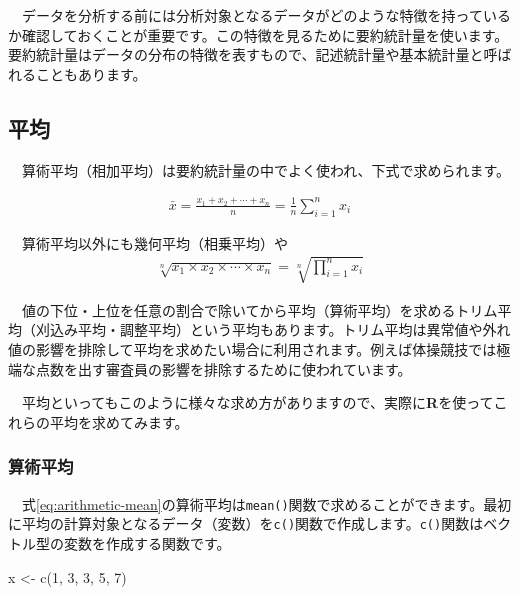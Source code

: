 \documentclass[
  12pt,
]{book}
\newenvironment{Shaded}{\begin{snugshade}}{\end{snugshade}}
\newcommand{\DecValTok}[1]{\textcolor[rgb]{0.00,0.00,0.81}{#1}}
\newcommand{\FunctionTok}[1]{\textcolor[rgb]{0.00,0.00,0.00}{#1}}
\newcommand{\NormalTok}[1]{#1}
\newcommand{\OtherTok}[1]{\textcolor[rgb]{0.56,0.35,0.01}{#1}}
\begin{document}
　データを分析する前には分析対象となるデータがどのような特徴を持っているか確認しておくことが重要です。この特徴を見るために要約統計量を使います。要約統計量はデータの分布の特徴を表すもので、記述統計量や基本統計量と呼ばれることもあります。

\hypertarget{ux5e73ux5747}{%
\subsection{平均}\label{ux5e73ux5747}}

　算術平均（相加平均）は要約統計量の中でよく使われ、下式で求められます。

\begin{align}
  \bar{x} = \frac{x_1 + x_2 + \cdots + x_n}{n} = \frac{1}{n} \sum_{i = 1}^n x_i \label{eq:arithmetic-mean}
\end{align}

　算術平均以外にも幾何平均（相乗平均）や \begin{align}
  \sqrt[n]{x_1 \times x_2 \times \cdots \times x_n} = \sqrt[n]{\prod_{i = 1}^n x_i} \label{eq:geometric-mean}
\end{align}

　値の下位・上位を任意の割合で除いてから平均（算術平均）を求めるトリム平均（刈込み平均・調整平均）という平均もあります。トリム平均は異常値や外れ値の影響を排除して平均を求めたい場合に利用されます。例えば体操競技では極端な点数を出す審査員の影響を排除するために使われています。

　平均といってもこのように様々な求め方がありますので、実際に\textbf{R}を使ってこれらの平均を求めてみます。

\hypertarget{ux7b97ux8853ux5e73ux5747}{%
\subsubsection*{算術平均}\label{ux7b97ux8853ux5e73ux5747}}

　式\eqref{eq:arithmetic-mean}の算術平均は\texttt{mean()}関数で求めることができます。最初に平均の計算対象となるデータ（変数）を\texttt{c()}関数で作成します。\texttt{c()}関数はベクトル型の変数を作成する関数です。

\begin{Shaded}
\begin{Highlighting}[numbers=left,,]
\NormalTok{x }\OtherTok{\textless{}{-}} \FunctionTok{c}\NormalTok{(}\DecValTok{1}\NormalTok{, }\DecValTok{3}\NormalTok{, }\DecValTok{3}\NormalTok{, }\DecValTok{5}\NormalTok{, }\DecValTok{7}\NormalTok{)}
\end{Highlighting}
\end{Shaded}
\end{document}
